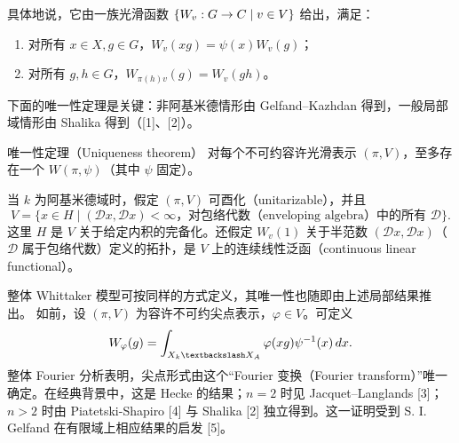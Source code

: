 具体地说，它由一族光滑函数 $\{W_v:G\to C\mid v\in V\}$ 给出，满足：
\begin{enumerate}
\item[(i)] 对所有 $x\in X,g\in G$，$W_v(xg)=\psi(x)W_v(g)$；
\item[(ii)] 对所有 $g,h\in G$，$W_{\pi(h)v}(g)=W_v(gh)$。
\end{enumerate}
下面的唯一性定理是关键：非阿基米德情形由 Gelfand--Kazhdan 得到，一般局部域情形由 Shalika 得到（[1]、[2]）。
\begin{originaltheorem}{唯一性定理（Uniqueness theorem）}
对每个不可约容许光滑表示 $(\pi,V)$，至多存在一个 $W(\pi,\psi)$（其中 $\psi$ 固定）。
\end{originaltheorem}
当 $k$ 为阿基米德域时，假定 $(\pi,V)$ 可酉化（unitarizable），并且
\[
V=\{x\in H\mid (\mathcal Dx,\mathcal Dx)<\infty\text{，对包络代数（enveloping algebra）中的所有 }\mathcal D\}.
\]
这里 $H$ 是 $V$ 关于给定内积的完备化。还假定 $W_v(1)$ 关于半范数 $(\mathcal Dx,\mathcal Dx)$（$\mathcal D$ 属于包络代数）定义的拓扑，是 $V$ 上的连续线性泛函（continuous linear functional）。

整体 Whittaker 模型可按同样的方式定义，其唯一性也随即由上述局部结果推出。
如前，设 $(\pi,V)$ 为容许不可约尖点表示，$\varphi\in V$。可定义
\[
W_\varphi(g)=\int_{X_k\backslash X_\A}\varphi(xg)\psi^{-1}(x)\,dx.
\]
整体 Fourier 分析表明，尖点形式由这个“Fourier 变换（Fourier transform）”唯一确定。在经典背景中，这是 Hecke 的结果；$n=2$ 时见 Jacquet--Langlands [3]；$n>2$ 时由 Piatetski-Shapiro [4] 与 Shalika [2] 独立得到。这一证明受到 S. I. Gelfand 在有限域上相应结果的启发 [5]。

